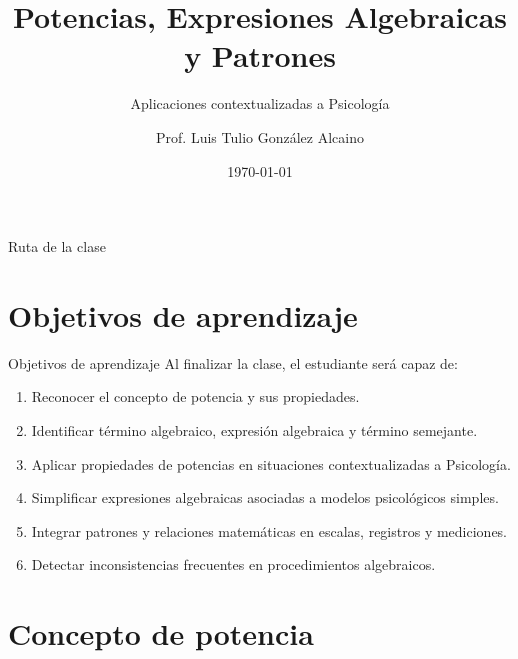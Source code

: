\documentclass[handout,aspectratio=169]{beamer}
\title[Potencias y Álgebra]{Potencias, Expresiones Algebraicas y Patrones}
\subtitle{Aplicaciones contextualizadas a Psicología}
\author{Prof. Luis Tulio González Alcaino}
\institute{Universidad Santo Tomás \\ Departamento de Ciencias Básicas}
\date{\today}
\begin{document}
	
	\begin{frame}
		\titlepage
	\end{frame}
	
	
	\begin{frame}{Ruta de la clase}
		\tableofcontents
	\end{frame}
	
	\section{Objetivos de aprendizaje}
	
	\begin{frame}{Objetivos de aprendizaje}
		Al finalizar la clase, el estudiante será capaz de:
		
		\begin{enumerate}
			\item Reconocer el concepto de potencia y sus propiedades.
			\item Identificar término algebraico, expresión algebraica y término semejante.
			\item Aplicar propiedades de potencias en situaciones contextualizadas a Psicología.
			\item Simplificar expresiones algebraicas asociadas a modelos psicológicos simples.
			\item Integrar patrones y relaciones matemáticas en escalas, registros y mediciones.
			\item Detectar inconsistencias frecuentes en procedimientos algebraicos.
		\end{enumerate}
	\end{frame}
	
	\section{Concepto de potencia}
	
\end{document}

